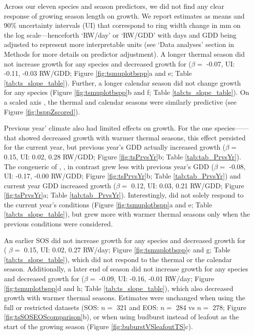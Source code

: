 \documentclass{article}\usepackage[]{graphicx}\usepackage[]{xcolor}
\begin{document}
Across our eleven species and season predictors, we did not find any clear response of growing season length on growth. 
We report estimates as means and 90\% uncertainty intervals (UI) that correspond to ring width change in mm on the log scale---henceforth `RW/day' or `RW/GDD' with days and GDD being adjusted to represent more interpretable units (see `Data analyses' section in Methods for more details on predictor adjustment).
A longer thermal season did not increase growth for any species and decreased growth for {\Ball}
($\beta =$ -0.07, UI:
-0.11,
-0.03 RW/GDD; Figure \ref{fig:tsmuplotbspp}a and e; Table \ref{tab:ts_slope_table}). 
Further, a longer calendar season did not change growth for any species (Figure \ref{fig:tsmuplotbspp}b and f; Table \ref{tab:ts_slope_table}). On a scaled axis \citep[through $z$-scoring,][]{gelman_data_2006}, the thermal and calendar seasons were similarly predictive (see Figure \ref{fig:bsppZscored}).

Previous year' climate also had limited effects on growth. For the one species---{\Ball}---that showed decreased growth with warmer thermal seasons, this effect persisted for the current year, but previous year's GDD actually increased growth 
($\beta =$ 0.15, UI:
0.02,
0.28 RW/GDD; Figure \ref{fig:tsPrvsYr}b; Table \ref{tab:tab_PrvsYr}). The congeneric of {\Ball}, {\Bnig}, in contrast grew less with previous year's GDD ($\beta =$ 
-0.08, UI:
-0.17,
-0.00 RW/GDD; Figure \ref{fig:tsPrvsYr}b; Table \ref{tab:tab_PrvsYr}) and current year GDD increased growth ($\beta =$ 
0.12, UI:
0.03,
0.21 RW/GDD; Figure \ref{fig:tsPrvsYr}a; Table \ref{tab:tab_PrvsYr}).
Interestingly, {\Bnig} did not solely respond to the current year's conditions (Figure \ref{fig:tsmuplotbspp}a and e; Table \ref{tab:ts_slope_table}), but grew more with warmer thermal seasons only when the previous conditions were considered. 

An earlier SOS did not increase growth for any species and decreased growth for {\Tame} (
$\beta =$ 0.15, UI:
0.02,
0.27 RW/day; Figure \ref{fig:tsmuplotbspp}c and g; Table \ref{tab:ts_slope_table}), which did not respond to the thermal or the calendar season. Additionally, a later end of season did not increase growth for any species and decreased growth for {\Ball}
($\beta =$ -0.09, UI:
-0.16,
-0.01 RW/day; Figure \ref{fig:tsmuplotbspp}d and h; Table \ref{tab:ts_slope_table}), which also decreased growth with warmer thermal seasons. Estimates were unchanged when using the full or restricted datasets (SOS: $n =$
321 and EOS: $n =$
284 vs $n =$
278; Figure \ref{fig:tsSOSEOScomparison}b), or when using budburst instead of leafout as the start of the growing season (Figure \ref{fig:buburstVSleafoutTS}c). 
\end{document}
